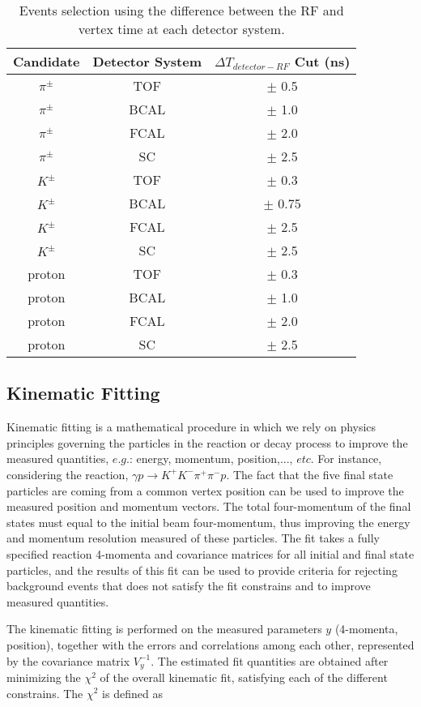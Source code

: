 \begin{table}[H]
    \centering
    \small
    \caption{Events selection using the difference between the RF and vertex time at each detector system.}
    \label{tab.y2175.evt_sel.pid_tim_sel}
    \begin{tabular}{|c|c|c|}
        \hline
        Candidate & Detector System & $\Delta T_{detector-RF}$ Cut (ns) \\
        \hline
        $\pi^{\pm}$ & TOF & $\pm$ 0.5 \\
        \hline
        $\pi^{\pm}$ & BCAL & $\pm$ 1.0 \\
        \hline
        $\pi^{\pm}$ & FCAL & $\pm$ 2.0 \\
        \hline
        $\pi^{\pm}$ & SC & $\pm$ 2.5 \\
        \hline
        $K^{\pm}$ & TOF &  $\pm$ 0.3 \\
        \hline
        $K^{\pm}$ & BCAL & $\pm$ 0.75 \\
        \hline
        $K^{\pm}$ & FCAL & $\pm$ 2.5 \\
        \hline
        $K^{\pm}$ & SC & $\pm$ 2.5 \\
        \hline
        proton & TOF & $\pm$ 0.3 \\
        \hline
        proton & BCAL & $\pm$ 1.0 \\
        \hline
        proton & FCAL & $\pm$ 2.0 \\
        \hline
        proton & SC & $\pm$ 2.5 \\
        \hline
    \end{tabular}
\end{table}

\subsection{Kinematic Fitting}
\label{chap.y2175.evt_sel.kin_fit}

Kinematic fitting is a mathematical procedure in which we rely on physics principles governing the particles in the reaction or decay process to improve the measured quantities, $e.g.$: energy, momentum, position,..., $etc$. For instance, considering the reaction, $\gamma p \rightarrow K^+ K^- \pi^+ \pi^- p$. The fact that the five final state particles are coming from a common vertex position can be used to improve the measured position and momentum vectors. The total four-momentum of the final states must equal to the initial beam four-momentum, thus improving the energy and momentum resolution measured of these particles. The fit takes a fully specified reaction 4-momenta and covariance matrices for all initial and final state particles, and the results of this fit can be used to  provide criteria for rejecting background events that does not satisfy the fit constrains and to improve measured quantities.
~\par The kinematic fitting is performed on the measured parameters $y$ (4-momenta, position), together with the errors and correlations among each other, represented by the covariance matrix $V_{y}^{-1}$. The estimated fit quantities are obtained after minimizing the $\chi^{2}$ of the overall kinematic fit, satisfying each of the different constrains. The $\chi^{2}$ is defined as

